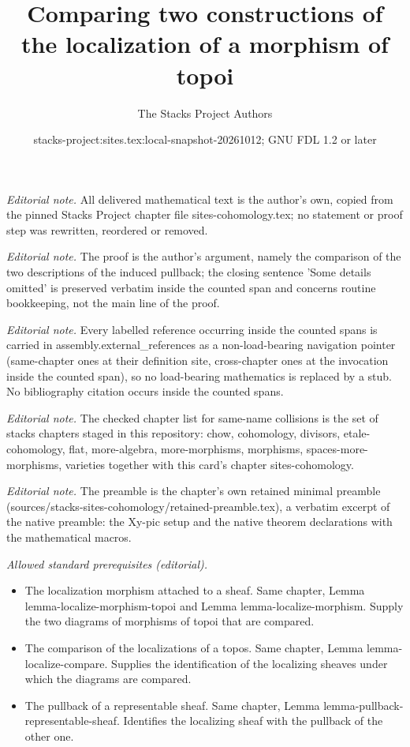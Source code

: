 \documentclass[10pt,a4paper]{amsart}
\title{Comparing two constructions of the localization of a morphism of topoi}
\author{The Stacks Project Authors}
\date{stacks-project:sites.tex:local-snapshot-20261012; GNU FDL 1.2 or later}
\theoremstyle{plain}
\theoremstyle{definition}
\theoremstyle{remark}
\numberwithin{equation}{subsection}
\begin{document}
\maketitle
\noindent\textit{Editorial note.} All delivered mathematical text is the author's own, copied from the pinned Stacks Project chapter file sites-cohomology.tex; no statement or proof step was rewritten, reordered or removed.\par\medskip
\noindent\textit{Editorial note.} The proof is the author's argument, namely the comparison of the two descriptions of the induced pullback; the closing sentence 'Some details omitted' is preserved verbatim inside the counted span and concerns routine bookkeeping, not the main line of the proof.\par\medskip
\noindent\textit{Editorial note.} Every labelled reference occurring inside the counted spans is carried in assembly.external\_references as a non-load-bearing navigation pointer (same-chapter ones at their definition site, cross-chapter ones at the invocation inside the counted span), so no load-bearing mathematics is replaced by a stub. No bibliography citation occurs inside the counted spans.\par\medskip
\noindent\textit{Editorial note.} The checked chapter list for same-name collisions is the set of stacks chapters staged in this repository: chow, cohomology, divisors, etale-cohomology, flat, more-algebra, more-morphisms, morphisms, spaces-more-morphisms, varieties together with this card's chapter sites-cohomology.\par\medskip
\noindent\textit{Editorial note.} The preamble is the chapter's own retained minimal preamble (sources/stacks-sites-cohomology/retained-preamble.tex), a verbatim excerpt of the native preamble: the Xy-pic setup and the native theorem declarations with the mathematical macros.\par\medskip
\noindent\textit{Allowed standard prerequisites (editorial).}\begin{itemize}
\item The localization morphism attached to a sheaf. Same chapter, Lemma lemma-localize-morphism-topoi and Lemma lemma-localize-morphism. Supply the two diagrams of morphisms of topoi that are compared.
\item The comparison of the localizations of a topos. Same chapter, Lemma lemma-localize-compare. Supplies the identification of the localizing sheaves under which the diagrams are compared.
\item The pullback of a representable sheaf. Same chapter, Lemma lemma-pullback-representable-sheaf. Identifies the localizing sheaf with the pullback of the other one.
\end{itemize}\medskip
\end{document}
